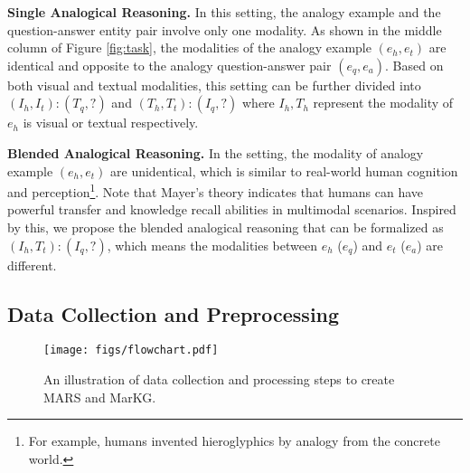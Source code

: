 \documentclass{article} \usepackage{iclr2023_conference,times}
\newcommand{\data}{MARS}
\newcommand{\kg}{MarKG}
\begin{document}
\textbf{Single Analogical Reasoning.}
In this setting, the analogy example and the question-answer entity pair involve only one modality.
As shown in the middle column of Figure \ref{fig:task},
the modalities of the analogy example $(e_h, e_t)$ are identical and opposite to the analogy question-answer pair $(e_q, e_a)$.
Based on both visual and textual modalities, this setting can be further divided into $(I_h, I_t):(T_q, ?)$ and $(T_h, T_t):(I_q, ?)$ where $I_h, T_h$ represent the modality of $e_h$ is visual or textual respectively.

\textbf{Blended Analogical Reasoning.}
In the setting, the modality of analogy example $(e_h, e_t)$ are unidentical, which is similar to real-world human cognition and perception\footnote{For example, humans invented hieroglyphics by analogy from the concrete world.}.
Note that Mayer's theory indicates that humans can have powerful transfer and knowledge recall abilities in multimodal scenarios. 
Inspired by this, we propose the blended analogical reasoning that can be formalized as $(I_h, T_t):(I_q, ?)$, which means the modalities between $e_h$ ($e_q$) and $e_t$ ($e_a$) are different.

\subsection{Data Collection and Preprocessing}
\label{sec:data_collect}

\begin{figure}[!t]
\centering
\texttt{[image: figs/flowchart.pdf]}
\caption{
An illustration of data collection and processing steps to create {\data} and {\kg}.}
\label{fig:flowchart}
\end{figure}
\end{document}
